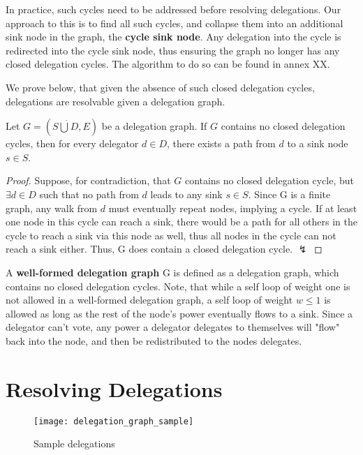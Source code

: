 In practice, such cycles need to be addressed before resolving delegations. Our approach to this is to find all such cycles, and collapse them into an additional sink node in the graph, the \textbf{cycle sink node}. Any delegation into the cycle is redirected into the cycle sink node,  thus ensuring the graph no longer has any closed delegation cycles. The algorithm to do so can be found in annex XX.  

We prove below, that given the absence of such closed delegation cycles, delegations are resolvable given a delegation graph. 

\begin{theorem}
Let $G = (S \dot\bigcup D, E)$ be a delegation graph. If $G$ contains no closed delegation cycles, then for every delegator $d \in D$, there exists a path from $d$ to a sink node $s \in S$.
\end{theorem}
\begin{proof}
Suppose, for contradiction, that $G$ contains no closed delegation cycle, but $\exists d \in D$ such that no path from $d$ leads to any sink $s \in S$. Since G is a finite graph, any walk from $d$ must eventually repeat nodes, implying a cycle. If at least one node in this cycle can reach a sink, there would be a path for all others in the cycle to reach a sink via this node as well, thus all nodes in the cycle can not reach a sink either. Thus, G does contain a closed delegation cycle. $\lightning$
\end{proof}

 A \textbf{well-formed delegation graph} G is defined as a delegation graph, which contains no closed delegation cycles. Note, that while a self loop of weight one is not allowed in a well-formed delegation graph, a self loop of weight $w \le 1$ is allowed as long as the rest of the node's power eventually flows to a sink. Since a delegator can't vote, any power a delegator delegates to themselves will "flow" back into the node, and then be redistributed to the nodes delegates. 

\section{Resolving Delegations}
\label{sec:resolving_delegations}

\begin{figure}[t]
	\centering
	\texttt{[image: delegation\_graph\_sample]}
	\caption{Sample delegations}
	\label{fig:sample_delegations}
\end{figure}

